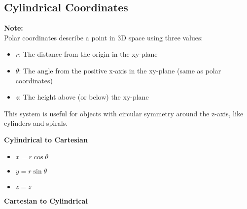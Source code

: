 \documentclass[10pt]{article}                               %
\begin{document}
\begin{adjustwidth}{2em}{0pt}
\begin{adjustwidth}{2em}{0pt}
\begin{examplebox}
\begin{adjustwidth}{2em}{0pt}
            \end{adjustwidth}
            

        \end{examplebox}


    \end{adjustwidth}


    \subsection*{Cylindrical Coordinates}

    \begin{adjustwidth}{2em}{0pt}

        \begin{notebox}

            \textbf{Note:} \\
            Polar coordinates describe a point in 3D space using three values:

            \begin{itemize}
                \item \( r \): The distance from the origin in the xy-plane
                \item \( \theta \): The angle from the positive x-axis in the xy-plane (same as polar coordinates)
                \item \( z \): The height above (or below) the xy-plane
            \end{itemize}

            This system is useful for objects with circular symmetry around the z-axis, like cylinders and spirals.

        \end{notebox}

        \vspace{0.5em}

        \textbf{Cylindrical to Cartesian}

        \begin{itemize}
            \item \( x = r\cos\theta \)
            \item \( y = r\sin\theta \)
            \item \( z = z \)
        \end{itemize}

        \vspace{0.5em}

        \textbf{Cartesian to Cylindrical}


\end{adjustwidth}
\end{adjustwidth}
\end{document}
